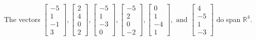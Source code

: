 \begin{exercise}
\begin{exerciseStatement}
  \end{exerciseStatement}
  \begin{exerciseAnswer}
   The vectors \(\left[\begin{array}{r}
-5 \\
1 \\
-1 \\
3
\end{array}\right] , \left[\begin{array}{r}
2 \\
4 \\
0 \\
2
\end{array}\right] , \left[\begin{array}{r}
-5 \\
1 \\
-3 \\
0
\end{array}\right] , \left[\begin{array}{r}
-5 \\
2 \\
0 \\
-2
\end{array}\right] , \left[\begin{array}{r}
0 \\
1 \\
-4 \\
1
\end{array}\right] , \text{ and } \left[\begin{array}{r}
4 \\
-5 \\
1 \\
-3
\end{array}\right]\) 
  	 do  
	span \(\mathbb{R}^4\).
  


  \end{exerciseAnswer}
\end{exercise}